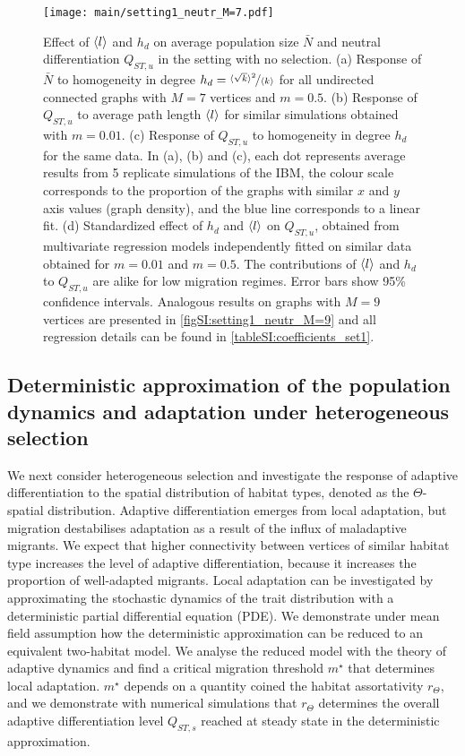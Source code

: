 \begin{figure}[ht]
    \centering
      \texttt{[image: main/setting1\_neutr\_M=7.pdf]}
      \caption{\small 
      Effect of $\langle l \rangle$ and $h_d$ on average population size $\bar{N}$ and neutral differentiation $Q_{ST,u}$ in the setting with no selection.
      (a) Response of $\bar{N}$ to homogeneity in degree $h_d = \nicefrac{\langle \sqrt{k} \rangle^2}{\langle k \rangle}$ for all undirected connected graphs with $M=7$ vertices and $m=0.5$.
      (b) Response of $Q_{ST,u}$ to average path length $\langle l \rangle$ for similar simulations obtained with $m=0.01$.
      (c) Response of $Q_{ST,u}$ to homogeneity in degree $h_d$ for the same data.
      In (a), (b) and (c), each dot represents average results from 5 replicate simulations of the IBM, the colour scale corresponds to the proportion of the graphs with similar $x$ and $y$ axis values (graph density), and the blue line corresponds to a linear fit. 
      (d) Standardized effect of $h_d$ and $\langle l \rangle$ on $Q_{ST,u}$, obtained from multivariate regression models independently fitted on similar data obtained for $m = 0.01$ and $m=0.5$.
      The contributions of $\langle l \rangle$ and $h_d$ to $Q_{ST,u}$ are alike for low migration regimes. Error bars show 95\% confidence intervals.
      Analogous results on graphs with $M=9$ vertices are presented in \cref{figSI:setting1_neutr_M=9} and all regression details can be found in \cref{tableSI:coefficients_set1}.
       }
      \label{fig:setting1_neutr_M=7}
\end{figure}
\FloatBarrier

\subsection{Deterministic approximation of the population dynamics and adaptation under heterogeneous selection}\label{sec:result2a}

We next consider heterogeneous selection and investigate the response of adaptive differentiation to the spatial distribution of habitat types, denoted as the $\Theta$-spatial distribution. 
%
Adaptive differentiation emerges from local adaptation, but migration destabilises adaptation as a result of the influx of maladaptive migrants. We expect that higher connectivity between vertices of similar habitat type increases the level of adaptive differentiation, because it increases the proportion of well-adapted migrants. Local adaptation can be investigated by approximating the stochastic dynamics of the trait distribution with a deterministic partial differential equation (PDE). We demonstrate under mean field assumption how the deterministic approximation can be reduced to an equivalent two-habitat model. We analyse the reduced model with the theory of adaptive dynamics \cite{Meszena1997,Mirrahimi2020} and find a critical migration threshold $m^\star$ that determines local adaptation. $m^\star$ depends on a quantity coined the habitat assortativity $r_\Theta$, and we demonstrate with numerical simulations that $r_\Theta$ determines the overall adaptive differentiation level $Q_{ST,s}$ reached at steady state in the deterministic approximation.

